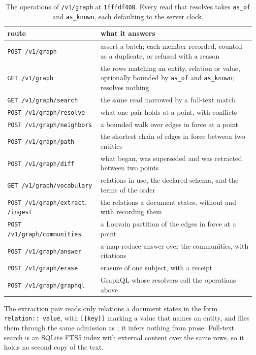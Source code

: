 \begin{table}[h]
\centering
\small
\begin{tabular}{@{}lp{}@{}}
\toprule
route & what it answers \\
\midrule
\texttt{POST /v1/graph} & assert a batch; each member recorded, counted as a duplicate, or refused with a reason \\
\texttt{GET /v1/graph} & the rows matching an entity, relation or value, optionally bounded by \texttt{as\_of} and \texttt{as\_known}; resolves nothing \\
\texttt{GET /v1/graph/search} & the same read narrowed by a full-text match \\
\texttt{POST /v1/graph/resolve} & what one pair holds at a point, with conflicts \\
\texttt{POST /v1/graph/neighbors} & a bounded walk over edges in force at a point \\
\texttt{POST /v1/graph/path} & the shortest chain of edges in force between two entities \\
\texttt{POST /v1/graph/diff} & what began, was superseded and was retracted between two points \\
\texttt{GET /v1/graph/vocabulary} & relations in use, the declared schema, and the terms of the order \\
\texttt{POST /v1/graph/extract}, \texttt{/ingest} & the relations a document states, without and with recording them \\
\texttt{POST /v1/graph/communities} & a Louvain partition of the edges in force at a point \\
\texttt{POST /v1/graph/answer} & a map-reduce answer over the communities, with citations \\
\texttt{POST /v1/graph/erase} & erasure of one subject, with a receipt \\
\texttt{POST /v1/graph/graphql} & GraphQL whose resolvers call the operations above \\
\bottomrule
\end{tabular}
\caption{The operations of \texttt{/v1/graph} at \texttt{1fffdf408}. Every read
that resolves takes \texttt{as\_of} and \texttt{as\_known}, each defaulting to
the server clock.}
\label{tab:surface}
\end{table}

The extraction pair reads only relations a document states in the form
\texttt{relation:: value}, with \texttt{[[key]]} marking a value that names an
entity, and files them through the same admission as ; it infers
nothing from prose. Full-text search is an SQLite FTS5 index with external
content over the same rows, so it holds no second copy of the text.
